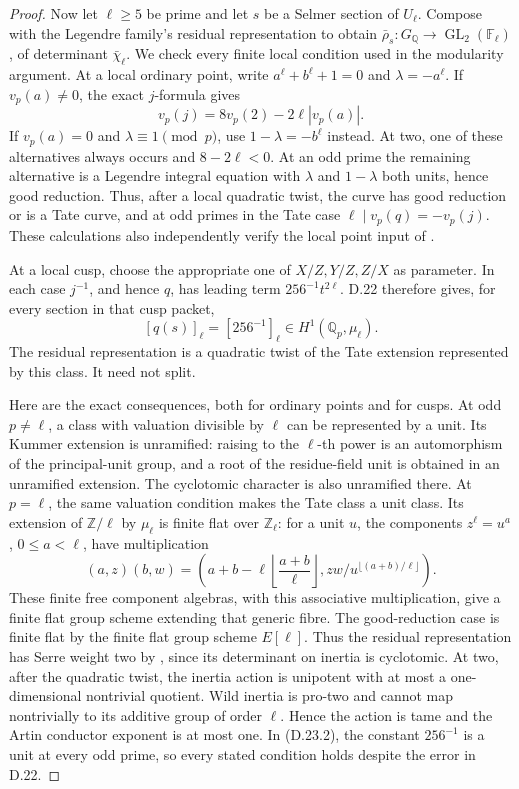 \begin{proof}
Now let \(\ell\ge5\) be prime and let \(s\) be
a Selmer section of \(U_\ell\). Compose with the
Legendre family's residual representation to
obtain
\(\bar\rho_s:G_{\mathbb Q}\to\operatorname{GL}_2(\mathbb F_\ell)\),
of determinant \(\bar\chi_\ell\). We check every
finite local condition used in the modularity
argument. At a local ordinary point, write
\(a^\ell+b^\ell+1=0\) and \(\lambda=-a^\ell\).
If \(v_p(a)\ne0\), the exact \(j\)-formula gives
\[
             v_p(j)=8v_p(2)-2\ell|v_p(a)|.          \tag{D.23.1}
\]
If \(v_p(a)=0\) and \(\lambda\equiv1\pmod p\),
use \(1-\lambda=-b^\ell\) instead. At two,
one of these alternatives always occurs and
\(8-2\ell<0\). At an odd prime the remaining
alternative is a Legendre integral equation
with \(\lambda\) and \(1-\lambda\) both units,
hence good reduction. Thus, after a local
quadratic twist, the curve has good reduction
or is a Tate curve, and at odd primes in the
Tate case \(\ell\mid v_p(q)=-v_p(j)\).
These calculations also independently verify
the local point input of
\cite[Lemma 5.12 and Proposition 5.13]{DE_Steklov2026}.

At a local cusp, choose the appropriate one
of \(X/Z,Y/Z,Z/X\) as parameter. In each case
\(j^{-1}\), and hence \(q\), has leading term
\(256^{-1}t^{2\ell}\). D.22 therefore gives,
for every section in that cusp packet,
\[
       [q(s)]_\ell=[256^{-1}]_\ell
                      \in H^1(\mathbb Q_p,\mu_\ell).
                                                               \tag{D.23.2}
\]
The residual representation is a quadratic
twist of the Tate extension represented by
this class. It need not split.

Here are the exact consequences, both for
ordinary points and for cusps. At odd
\(p\ne\ell\), a class with valuation divisible
by \(\ell\) can be represented by a unit.
Its Kummer extension is unramified: raising
to the \(\ell\)-th power is an automorphism
of the principal-unit group, and a root of
the residue-field unit is obtained in an
unramified extension. The cyclotomic character
is also unramified there. At \(p=\ell\), the
same valuation condition makes the Tate
class a unit class. Its extension of
\(\mathbb Z/\ell\) by \(\mu_\ell\) is finite
flat over \(\mathbb Z_\ell\): for a unit \(u\),
the components \(z^\ell=u^a\), \(0\le a<\ell\),
have multiplication
\[
 (a,z)(b,w)=\left(a+b-\ell\left\lfloor\frac{a+b}{\ell}\right\rfloor,
    zw/u^{\lfloor(a+b)/\ell\rfloor}\right).
\]
These finite free component algebras, with
this associative multiplication, give a
finite flat group scheme extending that generic fibre.
The good-reduction case is finite flat by
the finite flat group scheme \(E[\ell]\).
Thus the residual representation has Serre
weight two by \cite[\S2.8, Proposition 4]{DE_Serre1987},
since its determinant on inertia is cyclotomic.
At two, after the quadratic
twist, the inertia action is unipotent with
at most a one-dimensional nontrivial quotient.
Wild inertia is pro-two and cannot map
nontrivially to its additive group of order
\(\ell\). Hence the action is tame and the
Artin conductor exponent is at most one.
In (D.23.2), the constant \(256^{-1}\) is a
unit at every odd prime, so every stated
condition holds despite the error in D.22.


\end{proof}
